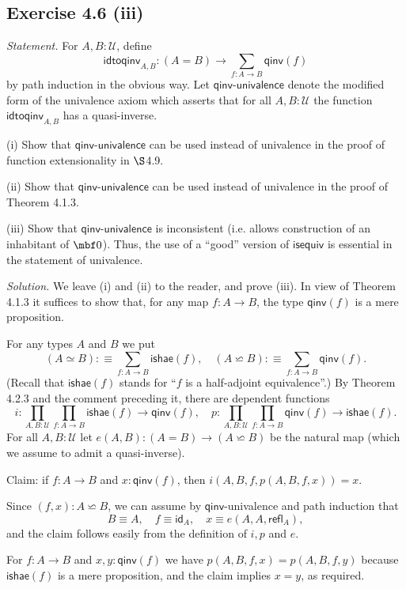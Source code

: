 \documentclass[12pt]{article}
\begin{document}

\subsection{Exercise 4.6 (iii)}

\emph{Statement.} For $A,B:\mathcal U$, define
$$
\mathsf{idtoqinv}_{A,B}:(A=B)\to\sum_{f:A\to B}\mathsf{qinv}(f)
$$
by path induction in the obvious way. Let $\mathsf{qinv}$-$\mathsf{univalence}$ denote the modified form of the univalence axiom which asserts that for all $A,B:\mathcal U$ the function $\mathsf{idtoqinv}_{A,B}$ has a quasi-inverse.

\nn(i) Show that $\mathsf{qinv}$-$\mathsf{univalence}$ can be used instead of univalence in the proof of function extensionality in $\S$4.9.

\nn(ii) Show that $\mathsf{qinv}$-$\mathsf{univalence}$ can be used instead of univalence in the proof of Theorem 4.1.3.

\nn(iii) Show that $\mathsf{qinv}$-$\mathsf{univalence}$ is inconsistent (i.e. allows construction of an inhabitant of $\mbf0$). Thus, the use of a ``good'' version of $\mathsf{isequiv}$ is essential in the statement of univalence.

\nn\emph{Solution.} We leave (i) and (ii) to the reader, and prove (iii). In view of Theorem 4.1.3 it suffices to show that, for any map $f:A\to B$, the type $\mathsf{qinv}(f)$ is a mere proposition. 

For any types $A$ and $B$ we put 
$$
(A\simeq B):\equiv\sum_{f:A\to B}\mathsf{ishae}(f),\quad(A\backsimeq B):\equiv\sum_{f:A\to B}\mathsf{qinv}(f).
$$ 
(Recall that $\mathsf{ishae}(f)$ stands for ``$f$ is a half-adjoint equivalence''.) By Theorem 4.2.3 and the comment preceding it, there are dependent functions 
$$
i:\prod_{A,B:\mathcal U}\prod_{f:A\to B}\mathsf{ishae}(f)\to\mathsf{qinv}(f),\quad p:\prod_{A,B:\mathcal U}\prod_{f:A\to B}\mathsf{qinv}(f)\to\mathsf{ishae}(f).
$$ 
For all $A,B:\mathcal U$ let $e(A,B):(A=B)\to(A\backsimeq B)$ be the natural map (which we assume to admit a quasi-inverse).

Claim: if $f:A\to B$ and $x:\mathsf{qinv}(f)$, then $i(A,B,f,p(A,B,f,x))=x$.
 
Since $(f,x):A\backsimeq B$, we can assume by $\mathsf{qinv}$-univalence and path induction that 
$$
B\equiv A,\quad f\equiv\mathsf{id}_A,\quad x\equiv e(A,A,\mathsf{refl}_A),
$$ 
and the claim follows easily from the definition of $i,p$ and $e$.

For $f:A\to B$ and $x,y:\mathsf{qinv}(f)$ we have $p(A,B,f,x)=p(A,B,f,y)$ because $\mathsf{ishae}(f)$ is a mere proposition, and the claim implies $x=y$, as required. 
\end{document}
